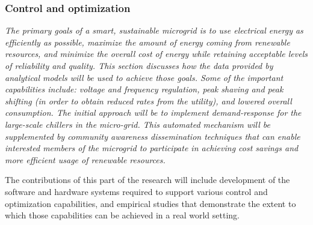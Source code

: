 
\subsubsection{Control and optimization}

{\em The primary goals of a smart, sustainable microgrid is to use
  electrical energy as efficiently as possible, maximize the amount of
  energy coming from renewable resources, and minimize the overall cost of
  energy while retaining acceptable levels of reliability and quality.
  This section discusses how the data provided by analytical models will be
  used to achieve those goals.  Some of the important capabilities include:
  voltage and frequency regulation, peak shaving and peak shifting (in
  order to obtain reduced rates from the utility), and lowered overall
  consumption. The initial approach will be to implement demand-response
  for the large-scale chillers in the micro-grid.  This automated mechanism
  will be supplemented by community awareness dissemination techniques that
  can enable interested members of the microgrid to participate in
  achieving cost savings and more efficient usage of renewable
  resources. 

  The contributions of this part of the research will include development of
  the software and hardware systems required to support various control and
  optimization capabilities, and empirical studies that demonstrate the
  extent to which those capabilities can be achieved in a real world
  setting. }

